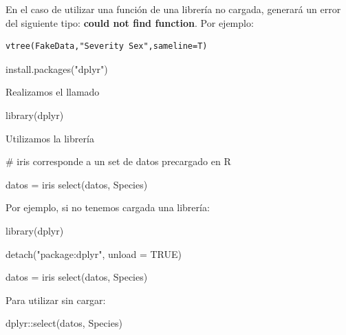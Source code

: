 \documentclass[
  letterpaper,
  DIV=11,
  numbers=noendperiod]{scrartcl}
\newenvironment{Shaded}{\begin{snugshade}}{\end{snugshade}}
\newcommand{\AttributeTok}[1]{\textcolor[rgb]{0.40,0.45,0.13}{#1}}
\newcommand{\CommentTok}[1]{\textcolor[rgb]{0.37,0.37,0.37}{#1}}
\newcommand{\ConstantTok}[1]{\textcolor[rgb]{0.56,0.35,0.01}{#1}}
\newcommand{\FunctionTok}[1]{\textcolor[rgb]{0.28,0.35,0.67}{#1}}
\newcommand{\NormalTok}[1]{\textcolor[rgb]{0.00,0.23,0.31}{#1}}
\newcommand{\OtherTok}[1]{\textcolor[rgb]{0.00,0.23,0.31}{#1}}
\newcommand{\SpecialCharTok}[1]{\textcolor[rgb]{0.37,0.37,0.37}{#1}}
\newcommand{\StringTok}[1]{\textcolor[rgb]{0.13,0.47,0.30}{#1}}
\begin{document}
En el caso de utilizar una función de una librería no cargada, generará
un error del siguiente tipo: \textbf{could not find function}. Por
ejemplo:

\begin{verbatim}
vtree(FakeData,"Severity Sex",sameline=T)
\end{verbatim}

\begin{Shaded}
\begin{Highlighting}[]
\FunctionTok{install.packages}\NormalTok{(}\StringTok{"dplyr"}\NormalTok{)}
\end{Highlighting}
\end{Shaded}

Realizamos el llamado

\begin{Shaded}
\begin{Highlighting}[]
\FunctionTok{library}\NormalTok{(dplyr)}
\end{Highlighting}
\end{Shaded}

Utilizamos la librería

\begin{Shaded}
\begin{Highlighting}[]
\CommentTok{\# iris corresponde a un set de datos precargado en R}

\NormalTok{datos }\OtherTok{=}\NormalTok{ iris}
\FunctionTok{select}\NormalTok{(datos, Species)}
\end{Highlighting}
\end{Shaded}

Por ejemplo, si no tenemos cargada una librería:

\begin{Shaded}
\begin{Highlighting}[]
\FunctionTok{library}\NormalTok{(dplyr)}

\FunctionTok{detach}\NormalTok{(}\StringTok{"package:dplyr"}\NormalTok{, }\AttributeTok{unload =} \ConstantTok{TRUE}\NormalTok{)}

\NormalTok{datos }\OtherTok{=}\NormalTok{ iris}
\FunctionTok{select}\NormalTok{(datos, Species)}
\end{Highlighting}
\end{Shaded}

Para utilizar sin cargar:

\begin{Shaded}
\begin{Highlighting}[]
\NormalTok{dplyr}\SpecialCharTok{::}\FunctionTok{select}\NormalTok{(datos, Species)}
\end{Highlighting}
\end{Shaded}
\end{document}
